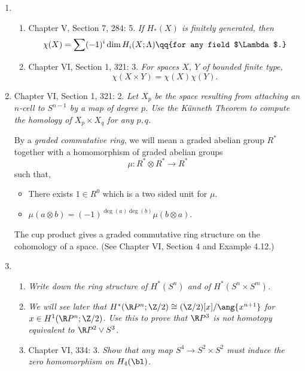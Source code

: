 \documentclass[onesided]{ccg-pset}
\author{Colton Grainger}
\date{\today}
\begin{document}
\maketitle

\begin{enumerate}
\item 
    \begin{enumerate}
        \item Chapter V, Section 7, 284: 5. \textit{If $H_*(X)$ is finitely generated, then 
            \[
                \chi(X) = \sum (-1)^i \dim H_i(X; \Lambda) \qq{for any field $\Lambda$.}
        \]}
    \item Chapter VI, Section 1, 321: 3. \textit{For spaces $X$, $Y$ of bounded finite type, 
        \[
            \chi(X \times Y) = \chi(X)\chi(Y).
        \]}
    \end{enumerate}


\item Chapter VI, Section 1, 321: 2. 
    \textit{Let $X_p$ be the space resulting from attaching an $n$-cell to $S^{n-1}$ by a map of degree $p$. Use the Künneth Theorem to compute the homology of $X_p \times X_q$ for any $p, q$.}

\begin{note}[]
    By a \emph{graded commutative ring}, we will mean a graded abelian group $R^*$ together with a homomorphism of graded abelian groups
    \[\mu \colon R^* \otimes R^* \to R^* \]
    such that,
    \begin{itemize}
    \item There exists $1 \in R^0$ which is a two sided unit for $\mu$.
    \item $\mu (a\otimes b) = (-1)^{\deg(a)\deg(b)} \mu(b\otimes a)$.
    \end{itemize}
    The cup product gives a graded commutative ring structure on the cohomology of a space. (See Chapter VI, Section 4 and Example 4.12.)
\end{note}

\item 
    \begin{enumerate}
        \item \textit{Write down the ring structure of $H^*(S^n)$ and of $H^*(S^n \times S^m)$.}        
        \item \textit{We will see later that $H^*(\R P^n ; \Z/2) \cong (\Z/2)[x]/\ang{ x^{n+1} }$ for $x \in H^1(\R P^n ; \Z/2)$. Use this to prove that $\R P^3$ is not homotopy equivalent to $\R P^2 \vee S^3$.}
        \item Chapter VI, 334: 3. \textit{Show that any map $S^4 \to S^2 \times S^2$ must induce the zero homomorphism on $H_4(\bl)$.}
\end{enumerate}


\end{enumerate}
\end{document}
